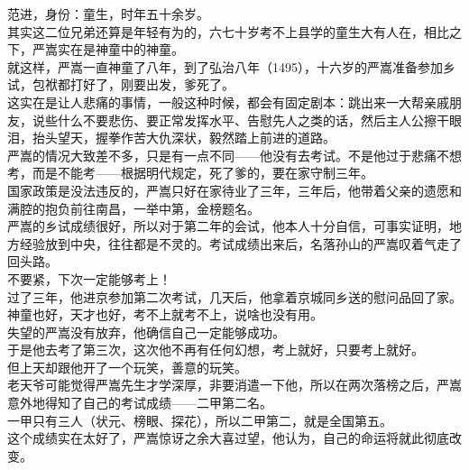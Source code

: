 \begin{multicols}{\theparacolNo}
范进，身份：童生，时年五十余岁。\\

其实这二位兄弟还算是年轻有为的，六七十岁考不上县学的童生大有人在，相比之下，严嵩实在是神童中的神童。\\

就这样，严嵩一直神童了八年，到了弘治八年（1495），十六岁的严嵩准备参加乡试，包袱都打好了，刚要出发，爹死了。\\

这实在是让人悲痛的事情，一般这种时候，都会有固定剧本：跳出来一大帮亲戚朋友，说些什么不要悲伤、要正常发挥水平、告慰先人之类的话，然后主人公擦干眼泪，抬头望天，握拳作苦大仇深状，毅然踏上前进的道路。\\

严嵩的情况大致差不多，只是有一点不同——他没有去考试。不是他过于悲痛不想考，而是不能考——根据明代规定，死了爹的，要在家守制三年。\\

国家政策是没法违反的，严嵩只好在家待业了三年，三年后，他带着父亲的遗愿和满腔的抱负前往南昌，一举中第，金榜题名。\\

严嵩的乡试成绩很好，所以对于第二年的会试，他本人十分自信，可事实证明，地方经验放到中央，往往都是不灵的。考试成绩出来后，名落孙山的严嵩叹着气走了回头路。\\

不要紧，下次一定能够考上！\\

过了三年，他进京参加第二次考试，几天后，他拿着京城同乡送的慰问品回了家。\\

神童也好，天才也好，考不上就考不上，说啥也没有用。\\

失望的严嵩没有放弃，他确信自己一定能够成功。\\

于是他去考了第三次，这次他不再有任何幻想，考上就好，只要考上就好。\\

但上天却跟他开了一个玩笑，善意的玩笑。\\

老天爷可能觉得严嵩先生才学深厚，非要消遣一下他，所以在两次落榜之后，严嵩意外地得知了自己的考试成绩——二甲第二名。\\

一甲只有三人（状元、榜眼、探花），所以二甲第二，就是全国第五。\\

这个成绩实在太好了，严嵩惊讶之余大喜过望，他认为，自己的命运将就此彻底改变。\\


\end{multicols}
